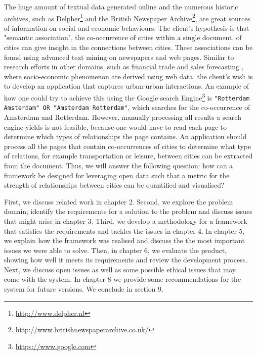 The huge amount of textual data generated online and the numerous historic archives, such as Delpher\footnote{\url{http://www.delpher.nl}} and the British Newspaper Archive\footnote{\url{http://www.britishnewspaperarchive.co.uk/}}, are great sources of information on social and economic behaviours. The client's hypothesis is that "semantic association", the co-occurrence of cities within a single document, of cities can give insight in the connections between cities. These associations can be found using advanced text mining on newspapers and web pages. Similar to research efforts in other domains, such as financial trade \cite{preis2013quantifying} and sales forecasting \cite{wu2014future}, where socio-economic phenomenon are derived using web data, the client's wish is to develop an application that captures urban-urban interactions. An example of how one could try to achieve this using the Google search Engine\footnote{\url{https://www.google.com}} is \texttt{"Rotterdam Amsterdam" OR "Amsterdam Rotterdam"}, which searches for the co-occurrence of Amsterdam and Rotterdam. However, manually processing all results a search engine yields is not feasible, because one would have to read each page to determine which types of relationships the page contains. An application should process all the pages that contain co-occurrences of cities to determine what type of relations, for example transportation or leisure, between cities can be extracted from the document. Thus, we will answer the following question: 
how can a framework be designed for leveraging open data such that a metric for the strength of relationships between cities can be quantified and visualised?

First, we discuss related work in chapter 2. Second, we explore the problem domain, identify the requirements for a solution to the problem and discuss issues that might arise in chapter 3. Third, we develop a methodology for a framework that satisfies the requirements and tackles the issues in chapter 4. In chapter 5, we explain how the framework was realised and discuss the the most important issues we were able to solve. Then, in chapter 6, we evaluate the product, showing how well it meets its requirements and review the development process. Next, we discuss open issues as well as some possible ethical issues that may come with the system. In chapter 8 we provide some recommendations for the system for future versions. We conclude in section 9.
